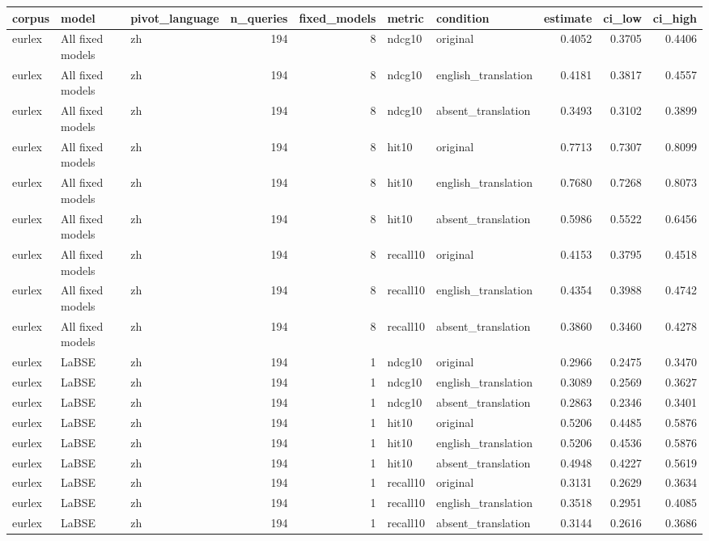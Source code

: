\begin{tabular}{lllrrllrrr}
\toprule
corpus & model & pivot\_language & n\_queries & fixed\_models & metric & condition & estimate & ci\_low & ci\_high \\
\midrule
eurlex & All fixed models & zh & 194 & 8 & ndcg10 & original & 0.4052 & 0.3705 & 0.4406 \\
eurlex & All fixed models & zh & 194 & 8 & ndcg10 & english\_translation & 0.4181 & 0.3817 & 0.4557 \\
eurlex & All fixed models & zh & 194 & 8 & ndcg10 & absent\_translation & 0.3493 & 0.3102 & 0.3899 \\
eurlex & All fixed models & zh & 194 & 8 & hit10 & original & 0.7713 & 0.7307 & 0.8099 \\
eurlex & All fixed models & zh & 194 & 8 & hit10 & english\_translation & 0.7680 & 0.7268 & 0.8073 \\
eurlex & All fixed models & zh & 194 & 8 & hit10 & absent\_translation & 0.5986 & 0.5522 & 0.6456 \\
eurlex & All fixed models & zh & 194 & 8 & recall10 & original & 0.4153 & 0.3795 & 0.4518 \\
eurlex & All fixed models & zh & 194 & 8 & recall10 & english\_translation & 0.4354 & 0.3988 & 0.4742 \\
eurlex & All fixed models & zh & 194 & 8 & recall10 & absent\_translation & 0.3860 & 0.3460 & 0.4278 \\
eurlex & LaBSE & zh & 194 & 1 & ndcg10 & original & 0.2966 & 0.2475 & 0.3470 \\
eurlex & LaBSE & zh & 194 & 1 & ndcg10 & english\_translation & 0.3089 & 0.2569 & 0.3627 \\
eurlex & LaBSE & zh & 194 & 1 & ndcg10 & absent\_translation & 0.2863 & 0.2346 & 0.3401 \\
eurlex & LaBSE & zh & 194 & 1 & hit10 & original & 0.5206 & 0.4485 & 0.5876 \\
eurlex & LaBSE & zh & 194 & 1 & hit10 & english\_translation & 0.5206 & 0.4536 & 0.5876 \\
eurlex & LaBSE & zh & 194 & 1 & hit10 & absent\_translation & 0.4948 & 0.4227 & 0.5619 \\
eurlex & LaBSE & zh & 194 & 1 & recall10 & original & 0.3131 & 0.2629 & 0.3634 \\
eurlex & LaBSE & zh & 194 & 1 & recall10 & english\_translation & 0.3518 & 0.2951 & 0.4085 \\
eurlex & LaBSE & zh & 194 & 1 & recall10 & absent\_translation & 0.3144 & 0.2616 & 0.3686 \\

\end{tabular}
